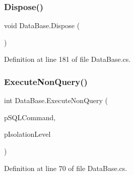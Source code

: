 \subsubsection{\texorpdfstring{Dispose()}{Dispose()}}
{\footnotesize\ttfamily void Data\+Base.\+Dispose (\begin{DoxyParamCaption}{ }\end{DoxyParamCaption})}



Definition at line 181 of file Data\+Base.\+cs.

\hypertarget{class_data_base_a496a94816107552b090d59a31c9aba33}{}\label{class_data_base_a496a94816107552b090d59a31c9aba33} 
\subsubsection{\texorpdfstring{Execute\+Non\+Query()}{ExecuteNonQuery()}\hspace{0.1cm}{\footnotesize\ttfamily [1/4]}}
{\footnotesize\ttfamily int Data\+Base.\+Execute\+Non\+Query (\begin{DoxyParamCaption}\item[{Sql\+Command}]{p\+S\+Q\+L\+Command,  }\item[{Isolation\+Level}]{p\+Isolation\+Level }\end{DoxyParamCaption})}



Definition at line 70 of file Data\+Base.\+cs.

